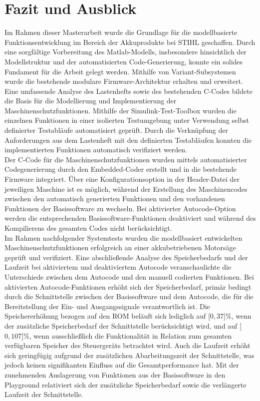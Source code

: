 \chapter{Fazit und Ausblick}
Im Rahmen dieser Masterarbeit wurde die Grundlage für die modellbasierte Funktionsentwicklung im Bereich der Akkuprodukte bei STIHL geschaffen. Durch eine sorgfältige Vorbereitung des Matlab-Modells, insbesondere hinsichtlich der Modellstruktur und der automatisierten Code-Generierung, konnte ein solides Fundament für die Arbeit gelegt werden. Mithilfe von Variant-Subsystemen wurde die bestehende modulare Firmware-Architektur erhalten und erweitert.\\
Eine umfassende Analyse des Lastenhefts sowie des bestehenden C-Codes bildete die Basis für die Modellierung und Implementierung der Maschinenschutzfunktionen. Mithilfe der Simulink-Test-Toolbox wurden die einzelnen Funktionen in einer isolierten Testumgebung unter Verwendung selbst definierter Testabläufe automatisiert geprüft. Durch die Verknüpfung der Anforderungen aus dem Lastenheft mit den definierten Testabläufen konnten die implementierten Funktionen automatisch verifiziert werden. \\
Der C-Code für die Maschinenschutzfunktionen wurden mittels automatisierter Codegenerierung durch den Embedded-Coder erstellt und in die bestehende Firmware integriert. Über eine Konfigurationsoption in der Header-Datei der jeweiligen Maschine ist es möglich, während der Erstellung des Maschinencodes zwischen den automatisch generierten Funktionen und den vorhandenen Funktionen der Basissoftware zu wechseln. Bei aktivierter Autocode-Option werden die entsprechenden Basissoftware-Funktionen deaktiviert und während des Kompilierens des gesamten Codes nicht berücksichtigt.\\
Im Rahmen nachfolgender Systemtests wurden die modellbasiert entwickelten Maschinenschutzfunktionen erfolgreich an einer akkubetriebenen Motorsäge geprüft und verifiziert. Eine abschließende Analyse des Speicherbedarfs und der Laufzeit bei aktiviertem und deaktiviertem Autocode veranschaulichte die Unterschiede zwischen dem Autocode und den manuell codierten Funktionen. Bei aktivierten Autocode-Funktionen erhöht sich der Speicherbedarf, primär bedingt durch die Schnittstelle zwischen der Basissoftware und dem Autocode, die für die Bereitstellung der Ein- und Ausgangssignale verantwortlich ist. Die Speichererhöhung bezogen auf den ROM beläuft sich lediglich auf \unit[$0,37$]{\%}, wenn der zusätzliche Speicherbedarf der Schnittstelle berücksichtigt wird, und auf \unit[$0,107$]{\%}, wenn ausschließlich die Funktionalität in Relation zum gesamten verfügbaren Speicher des Steuergeräts betrachtet wird. Auch die Laufzeit erhöht sich geringfügig aufgrund der zusätzlichen Abarbeitungszeit der Schnittstelle, was jedoch keinen signifikanten Einfluss auf die Gesamtperformance hat. Mit der zunehmenden Auslagerung von Funktionen aus der Basissoftware in den Playground relativiert sich der zusätzliche Speicherbedarf sowie die verlängerte Laufzeit der Schnittstelle.\\
